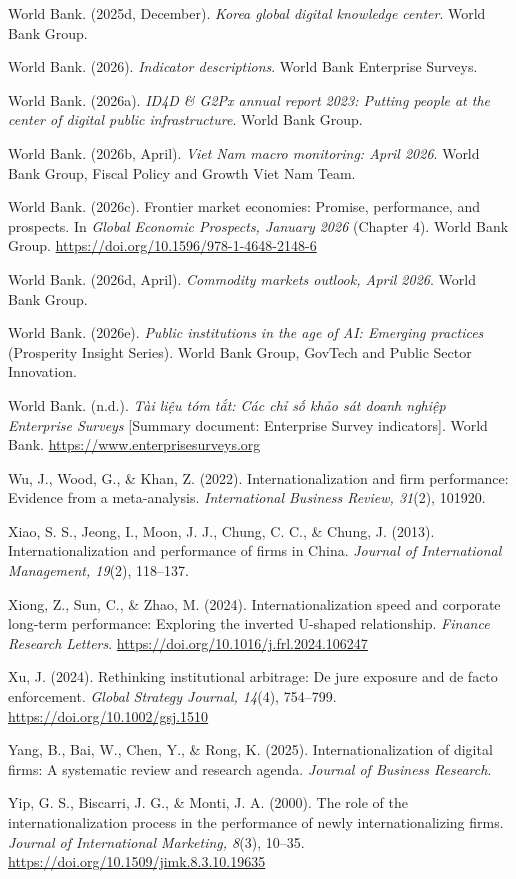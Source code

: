 \documentclass[
  a4paper,
  13pt]{extreport}
\begin{document}
World Bank. (2025d, December). \emph{Korea global digital knowledge
center}. World Bank Group.

World Bank. (2026). \emph{Indicator descriptions}. World Bank Enterprise
Surveys.

World Bank. (2026a). \emph{ID4D \& G2Px annual report 2023: Putting
people at the center of digital public infrastructure}. World Bank
Group.

World Bank. (2026b, April). \emph{Viet Nam macro monitoring: April
2026}. World Bank Group, Fiscal Policy and Growth Viet Nam Team.

World Bank. (2026c). Frontier market economies: Promise, performance,
and prospects. In \emph{Global Economic Prospects, January 2026}
(Chapter 4). World Bank Group.
\url{https://doi.org/10.1596/978-1-4648-2148-6}

World Bank. (2026d, April). \emph{Commodity markets outlook, April
2026}. World Bank Group.

World Bank. (2026e). \emph{Public institutions in the age of AI:
Emerging practices} (Prosperity Insight Series). World Bank Group,
GovTech and Public Sector Innovation.

World Bank. (n.d.). \emph{Tài liệu tóm tắt: Các chỉ số khảo sát doanh
nghiệp Enterprise Surveys} {[}Summary document: Enterprise Survey
indicators{]}. World Bank. \url{https://www.enterprisesurveys.org}

Wu, J., Wood, G., \& Khan, Z. (2022). Internationalization and firm
performance: Evidence from a meta-analysis. \emph{International Business
Review, 31}(2), 101920.

Xiao, S. S., Jeong, I., Moon, J. J., Chung, C. C., \& Chung, J. (2013).
Internationalization and performance of firms in China. \emph{Journal of
International Management, 19}(2), 118--137.

Xiong, Z., Sun, C., \& Zhao, M. (2024). Internationalization speed and
corporate long-term performance: Exploring the inverted U-shaped
relationship. \emph{Finance Research Letters}.
\url{https://doi.org/10.1016/j.frl.2024.106247}

Xu, J. (2024). Rethinking institutional arbitrage: De jure exposure and
de facto enforcement. \emph{Global Strategy Journal, 14}(4), 754--799.
\url{https://doi.org/10.1002/gsj.1510}

Yang, B., Bai, W., Chen, Y., \& Rong, K. (2025). Internationalization of
digital firms: A systematic review and research agenda. \emph{Journal of
Business Research}.

Yip, G. S., Biscarri, J. G., \& Monti, J. A. (2000). The role of the
internationalization process in the performance of newly
internationalizing firms. \emph{Journal of International Marketing,
8}(3), 10--35. \url{https://doi.org/10.1509/jimk.8.3.10.19635}
\end{document}
